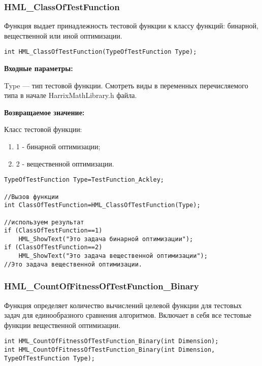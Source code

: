 \documentclass[a4paper,12pt]{article}
\begin{document}
\subsubsection{HML\_ClassOfTestFunction}\label{HML_ClassOfTestFunction}

Функция выдает принадлежность тестовой функции к классу функций: бинарной, вещественной или иной оптимизации.


\begin{lstlisting}[label=code_syntax_HML_ClassOfTestFunction,caption=Синтаксис]
int HML_ClassOfTestFunction(TypeOfTestFunction Type);
\end{lstlisting}

\textbf{Входные параметры:}

Type --- тип тестовой функции. Смотреть виды в переменных перечисляемого типа в начале HarrixMathLibrary.h файла.

\textbf{Возвращаемое значение:}

Класс тестовой функции:

\begin{enumerate}
\item 1 - бинарной оптимизации;
\item 2 - вещественной оптимизации.
\end{enumerate}


\begin{lstlisting}[label=code_use_HML_ClassOfTestFunction,caption=Пример использования]
TypeOfTestFunction Type=TestFunction_Ackley;

//Вызов функции
int ClassOfTestFunction=HML_ClassOfTestFunction(Type);

//используем результат
if (ClassOfTestFunction==1)
    HML_ShowText("Это задача бинарной оптимизации");
if (ClassOfTestFunction==2)
    HML_ShowText("Это задача вещественной оптимизации");
//Это задача вещественной оптимизации.
\end{lstlisting}

\subsubsection{HML\_CountOfFitnessOfTestFunction\_Binary}\label{HML_CountOfFitnessOfTestFunction_Binary}

Функция определяет количество вычислений целевой функции для тестовых задач для единообразного сравнения алгоритмов. Включает в себя все тестовые функции вещественной оптимизации.


\begin{lstlisting}[label=code_syntax_HML_CountOfFitnessOfTestFunction_Binary,caption=Синтаксис]
int HML_CountOfFitnessOfTestFunction_Binary(int Dimension);
int HML_CountOfFitnessOfTestFunction_Binary(int Dimension, TypeOfTestFunction Type);
\end{lstlisting}
\end{document}
